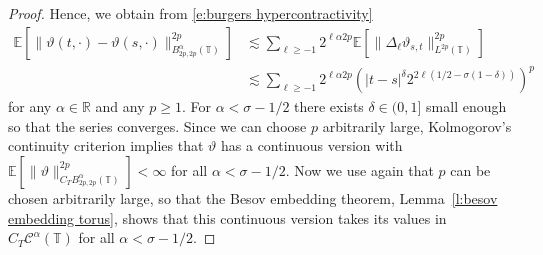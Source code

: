 \documentclass[a4paper,11pt]{article}
\newcommand{\mathD}{\mathrm{D}}
\newcommand{\tmop}[1]{\ensuremath{\operatorname{#1}}}
\theoremstyle{remark}
\newcommand{\R}{\mathbb{R}}
\newcommand{\E}{\mathbb{E}}
\newcommand{\CC}{\ensuremath{\mathscr{C}}}
\begin{document}
\begin{proof}
   Hence, we obtain from \eqref{e:burgers hypercontractivity}
   \begin{align*}
      \E[\lVert \vartheta(t, \cdot) - \vartheta(s,\cdot)\rVert_{B^\alpha_{2p,2p}(\mathbb{T})}^{2p} ] & \lesssim \sum_{\ell \geqslant -1} 2^{\ell \alpha 2p} \E [\lVert \Delta_\ell \vartheta_{s,t}\rVert_{L^{2p}(\mathbb{T})}^{2p} ] \\
      & \lesssim \sum_{\ell \geqslant -1} 2^{\ell \alpha 2p} \left(|t-s|^{\delta} 2^{2\ell(1/2 - \sigma (1-\delta))}\right)^p
   \end{align*}
   for any $\alpha \in \R$ and any $p \geqslant 1$. For $\alpha < \sigma - 1/2$ there exists $\delta \in (0,1]$ small enough so that the series converges. Since we can choose $p$ arbitrarily large, Kolmogorov's continuity criterion %
   implies that $\vartheta$ has a continuous version with $\E[ \|\vartheta \|_{C_T B^{\alpha}_{2 p, 2 p}(\mathbb{T})}^{2p}]< \infty$ for all $\alpha < \sigma - 1/2$. Now we use again that $p$ can be chosen arbitrarily large, so that the Besov embedding theorem, Lemma~\ref{l:besov embedding torus}, shows that this continuous version takes its values in $C_T \CC^{\alpha}(\mathbb{T})$ for all $\alpha < \sigma - 1/2$.
\end{proof}

%
\end{document}
